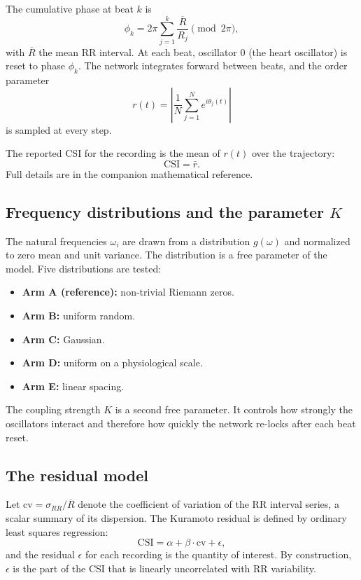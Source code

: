 \documentclass[11pt]{article}
\begin{document}
The cumulative phase at beat $k$ is
\begin{equation}
\phi_k = 2\pi \sum_{j=1}^{k} \frac{\overline{R}}{R_j} \pmod{2\pi},
\label{eq:rrphase}
\end{equation}
with $\overline{R}$ the mean RR interval. At each beat, oscillator 0
(the heart oscillator) is reset to phase $\phi_k$. The network
integrates forward between beats, and the order parameter
\begin{equation}
r(t) = \left| \frac{1}{N} \sum_{j=1}^{N} e^{i\theta_j(t)} \right|
\label{eq:orderparam}
\end{equation}
is sampled at every step.

The reported CSI for the recording is the mean of $r(t)$ over the
trajectory:
\begin{equation}
\mathrm{CSI} = \bar{r}.
\label{eq:csi}
\end{equation}
Full details are in the companion mathematical reference.

\subsection{Frequency distributions and the parameter $K$}

The natural frequencies $\omega_i$ are drawn from a distribution
$g(\omega)$ and normalized to zero mean and unit variance. The
distribution is a free parameter of the model. Five distributions are
tested:

\begin{itemize}
\item \textbf{Arm A (reference):} non-trivial Riemann zeros.
\item \textbf{Arm B:} uniform random.
\item \textbf{Arm C:} Gaussian.
\item \textbf{Arm D:} uniform on a physiological scale.
\item \textbf{Arm E:} linear spacing.
\end{itemize}

The coupling strength $K$ is a second free parameter. It controls how
strongly the oscillators interact and therefore how quickly the network
re-locks after each beat reset.

\subsection{The residual model}

Let $\mathrm{cv} = \sigma_{RR}/\overline{R}$ denote the coefficient of
variation of the RR interval series, a scalar summary of its dispersion.
The Kuramoto residual is defined by ordinary least squares regression:
\begin{equation}
\mathrm{CSI} = \alpha + \beta \cdot \mathrm{cv} + \epsilon,
\label{eq:residual}
\end{equation}
and the residual $\epsilon$ for each recording is the quantity of
interest. By construction, $\epsilon$ is the part of the CSI that is
linearly uncorrelated with RR variability.
\end{document}
